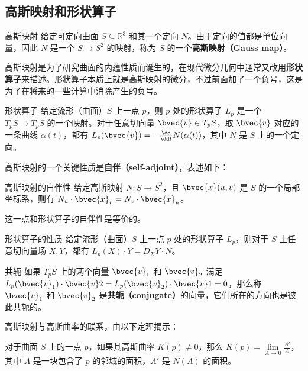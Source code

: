 
\subsection{高斯映射和形状算子}
\begin{definition}{高斯映射}
给定可定向曲面 $S\subseteq\mathbb{R}^3$ 和其一个定向 $N$。由于定向的值都是单位向量，因此 $N$ 是一个 $S\to S^2$ 的映射，称为 $S$ 的一个\textbf{高斯映射（Gauss map）}。
\end{definition}

高斯映射是为了研究曲面的内蕴性质而诞生的，在现代微分几何中通常又改用\textbf{形状算子}来描述。形状算子本质上就是高斯映射的微分，不过前面加了一个负号，这是为了在将来的一些计算中消除产生的负号。

\begin{definition}{形状算子}
给定流形（曲面）$S$ 上一点 $p$，则 $p$ 处的形状算子 $L_p$ 是一个 $T_pS\to T_pS$ 的一个映射。对于任意切向量 $\bvec{v}\in T_pS$，取 $\bvec{v}$ 对应的一条曲线 $\alpha(t)$，都有 $L_p(\bvec{v})=-\frac{\dd}{\dd t}N(\alpha(t))$，其中 $N$ 是 $S$ 上的一个定向。
\end{definition}


高斯映射的一个关键性质是\textbf{自伴（self-adjoint）}，表述如下：

\begin{theorem}{高斯映射的自伴性}
给定高斯映射 $N:S\to S^2$，且 $\bvec{x}(u, v)$ 是 $S$ 的一个局部坐标系，则有 $N_u\cdot \bvec{x}_v=N_v\cdot \bvec{x}_u$。
\end{theorem}

这一点和形状算子的自伴性是等价的。

\begin{theorem}{形状算子的性质}
给定流形（曲面）$S$ 上一点 $p$ 处的形状算子 $L_p$，则对于 $S$ 上任意切向量场 $X, Y$，都有 $L_p(X)\cdot Y=D_XY\cdot N$。
\end{theorem}


\begin{definition}{共轭}
如果 $T_pS$ 上的两个向量 $\bvec{v}_1$ 和 $\bvec{v}_2$ 满足 $L_p(\bvec{v}_1)\cdot \bvec{v}2=L_p(\bvec{v}_2)\cdot \bvec{v}1=0$，那么称 $\bvec{v}_1$ 和 $\bvec{v}_2$ 是\textbf{共轭（conjugate）}的向量，它们所在的方向也是彼此共轭的。
\end{definition}

高斯映射与高斯曲率的联系，由以下定理揭示：

\begin{theorem}{}
对于曲面 $S$ 上的一点 $p$，如果其高斯曲率 $K(p)\not=0$，那么 $K(p)=\lim\limits_{A\to 0}\frac{A'}{A}$，其中 $A$ 是一块包含了 $p$ 的邻域的面积，$A'$ 是 $N(A)$ 的面积。
\end{theorem}

